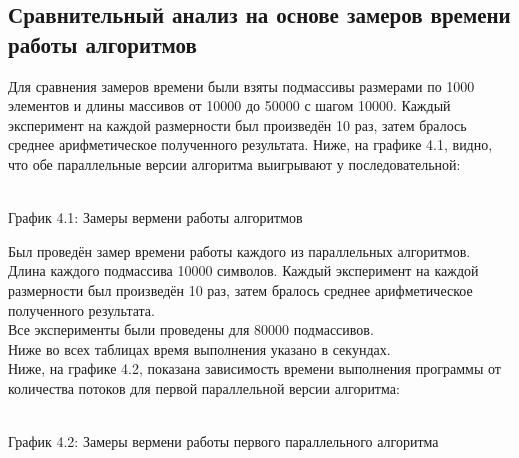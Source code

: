 \documentclass[12pt,a4paper]{article}
\numberwithin{equation}{section}
\begin{document}
\subsection{Сравнительный анализ на основе замеров времени работы алгоритмов}
Для сравнения замеров времени были взяты подмассивы размерами по 1000 элементов и длины массивов от 10000 до 50000 с шагом 10000.
Каждый эксперимент на каждой размерности был произведён 10 раз, затем бралось среднее арифметическое полученного результата.
Ниже, на графике 4.1, видно, что обе параллельные версии алгоритма выигрывают у последовательной:\\
\begin{center}
	\\
	График 4.1: Замеры вермени работы алгоритмов\\
\end{center}
Был проведён замер времени работы каждого из параллельных алгоритмов. Длина каждого подмассива 10000 символов. Каждый эксперимент на каждой размерности был произведён 10 раз, затем бралось среднее арифметическое полученного результата.\\
Все эксперименты были проведены для 80000 подмассивов.\\
Ниже во всех таблицах время выполнения указано в секундах.\\

Ниже, на графике 4.2, показана зависимость времени выполнения программы от количества потоков для первой параллельной версии алгоритма:\\

\begin{center}
	\\
	График 4.2: Замеры вермени работы первого параллельного алгоритма\\
\end{center}
\end{document}
